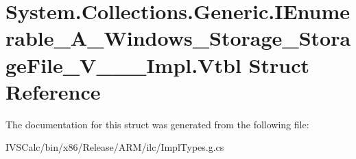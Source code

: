 \hypertarget{struct_system_1_1_collections_1_1_generic_1_1_i_enumerable___a___windows___storage___storage_file___v_______impl_1_1_vtbl}{}\section{System.\+Collections.\+Generic.\+I\+Enumerable\+\_\+\+A\+\_\+\+Windows\+\_\+\+Storage\+\_\+\+Storage\+File\+\_\+\+V\+\_\+\+\_\+\+\_\+\+Impl.\+Vtbl Struct Reference}
\label{struct_system_1_1_collections_1_1_generic_1_1_i_enumerable___a___windows___storage___storage_file___v_______impl_1_1_vtbl}


The documentation for this struct was generated from the following file\+:\begin{DoxyCompactItemize}
\item 
I\+V\+S\+Calc/bin/x86/\+Release/\+A\+R\+M/ilc/Impl\+Types.\+g.\+cs\end{DoxyCompactItemize}
